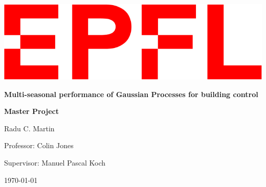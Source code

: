 \begin{titlepage}
\begin{center}

\includegraphics[width=0.5\linewidth]{Logo-EPFL.png}\par
\vspace{5cm}

{\Huge \bf Multi-seasonal performance of Gaussian Processes for building control \par}
\vspace{1cm}
{\LARGE \bf Master Project\par}

\vspace{6cm}
{\Large Radu C. Martin}\par
\vspace{2cm}

{\large Professor: Colin Jones}\par
{\large Supervisor: Manuel Pascal Koch}\par

\vspace{0.5cm}
{\large\today}

\end{center}
\end{titlepage}
